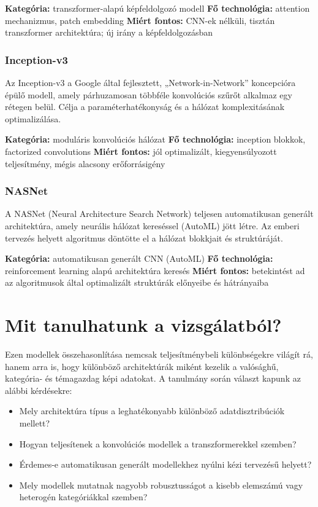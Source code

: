 \textbf{Kategória:} transzformer-alapú képfeldolgozó modell  
\textbf{Fő technológia:} attention mechanizmus, patch embedding  
\textbf{Miért fontos:} CNN-ek nélküli, tisztán transzformer architektúra; új irány a képfeldolgozásban

\subsubsection{Inception-v3}
Az Inception-v3 a Google által fejlesztett, „Network-in-Network” koncepcióra épülő modell, amely párhuzamosan többféle konvolúciós szűrőt alkalmaz egy rétegen belül. Célja a paraméterhatékonyság és a hálózat komplexitásának optimalizálása.

\textbf{Kategória:} moduláris konvolúciós hálózat  
\textbf{Fő technológia:} inception blokkok, factorized convolutions  
\textbf{Miért fontos:} jól optimalizált, kiegyensúlyozott teljesítmény, mégis alacsony erőforrásigény

\subsubsection{NASNet}
A NASNet (Neural Architecture Search Network) teljesen automatikusan generált architektúra, amely neurális hálózat kereséssel (AutoML) jött létre. Az emberi tervezés helyett algoritmus döntötte el a hálózat blokkjait és struktúráját.

\textbf{Kategória:} automatikusan generált CNN (AutoML)  
\textbf{Fő technológia:} reinforcement learning alapú architektúra keresés  
\textbf{Miért fontos:} betekintést ad az algoritmusok által optimalizált struktúrák előnyeibe és hátrányaiba

\section{Mit tanulhatunk a vizsgálatból?}

Ezen modellek összehasonlítása nemcsak teljesítménybeli különbségekre világít rá, hanem arra is, hogy különböző architektúrák miként kezelik a valósághű, kategória- és témagazdag képi adatokat. A tanulmány során választ kapunk az alábbi kérdésekre:

\begin{itemize}
    \item Mely architektúra típus a leghatékonyabb különböző adatdisztribúciók mellett?
    \item Hogyan teljesítenek a konvolúciós modellek a transzformerekkel szemben?
    \item Érdemes-e automatikusan generált modellekhez nyúlni kézi tervezésű helyett?
    \item Mely modellek mutatnak nagyobb robusztusságot a kisebb elemszámú vagy heterogén kategóriákkal szemben?
\end{itemize}

